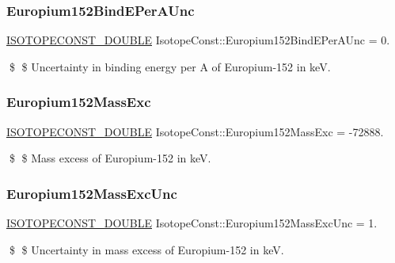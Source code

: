 \subsubsection{\texorpdfstring{Europium152\+Bind\+E\+Per\+A\+Unc}{Europium152BindEPerAUnc}}
{\footnotesize\ttfamily \mbox{\hyperlink{group___isotope_const-_macros_ga8f45a7272ce02c0b4c65c44636ed719a}{I\+S\+O\+T\+O\+P\+E\+C\+O\+N\+S\+T\+\_\+\+D\+O\+U\+B\+LE}} Isotope\+Const\+::\+Europium152\+Bind\+E\+Per\+A\+Unc = 0.}

\$ \$ Uncertainty in binding energy per A of Europium-\/152 in keV. \mbox{\label{group___isotope_const-_europium-_eu152_gad5c9ccf2ca3cb231ee04b9c92f3f7813}} 
\subsubsection{\texorpdfstring{Europium152\+Mass\+Exc}{Europium152MassExc}}
{\footnotesize\ttfamily \mbox{\hyperlink{group___isotope_const-_macros_ga8f45a7272ce02c0b4c65c44636ed719a}{I\+S\+O\+T\+O\+P\+E\+C\+O\+N\+S\+T\+\_\+\+D\+O\+U\+B\+LE}} Isotope\+Const\+::\+Europium152\+Mass\+Exc = -\/72888.}

\$ \$ Mass excess of Europium-\/152 in keV. \mbox{\label{group___isotope_const-_europium-_eu152_ga20355bc4ab48ab9a0589e1ca41eb32bb}} 
\subsubsection{\texorpdfstring{Europium152\+Mass\+Exc\+Unc}{Europium152MassExcUnc}}
{\footnotesize\ttfamily \mbox{\hyperlink{group___isotope_const-_macros_ga8f45a7272ce02c0b4c65c44636ed719a}{I\+S\+O\+T\+O\+P\+E\+C\+O\+N\+S\+T\+\_\+\+D\+O\+U\+B\+LE}} Isotope\+Const\+::\+Europium152\+Mass\+Exc\+Unc = 1.}

\$ \$ Uncertainty in mass excess of Europium-\/152 in keV. \mbox{\label{group___isotope_const-_europium-_eu152_ga6114723f6719e9813ca8c10d76e0cdcc}} 
